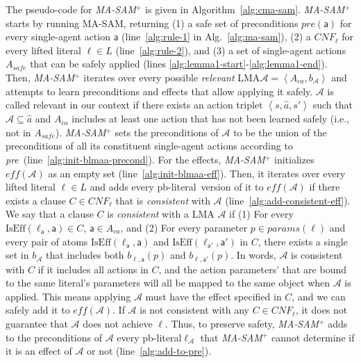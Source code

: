 \documentclass[letterpaper]{article} %
\newcommand{\pre}{\textit{pre}}
\newcommand{\eff}{\textit{eff}}
\theoremstyle{definition}
\theoremstyle{remark}
\newcommand{\tuple}[1]{\ensuremath{\left \langle #1 \right \rangle }}
\newcommand{\params}{\textit{params}}
\newcommand{\cnf}{\textit{CNF}}
\newcommand{\liftl}{\ensuremath{\ell}}
\newcommand{\lifta}{\mathsf{a}}
\newcommand{\iseff}{\text{IsEff}}
\newcommand{\masam}{\ac{MA-SAM}\xspace}
\newcommand{\cmasam}{\textit{MA-SAM\ensuremath{^+}}\xspace}
\newcommand{\blmaa}{\ac{LMA}\xspace}
\newcommand{\pbl}{pb-literal\xspace}
\begin{document}
The pseudo-code for \cmasam is given in Algorithm~\ref{alg:cma-sam}. 
\cmasam starts by running \masam, returning (1) a safe set of preconditions $\pre(\lifta)$ for every single-agent action $\lifta$ (line~\ref{alg:rule-1} in Alg.~\ref{alg:ma-sam}), 
(2) a $CNF_{\liftl}$ for every lifted literal $\liftl \in L$  (line~\ref{alg:rule-2}), 
and (3) a set of single-agent actions $A_{safe}$ that can be safely applied (lines \ref{alg:lemma1-start}-\ref{alg:lemma1-end}).  
Then, \cmasam iterates over every possible \emph{relevant} \blmaa $\mathcal{A}=\tuple{A_{ca},b_\mathcal{A}}$ and attempts to learn preconditions and effects that allow applying it safely. 
$\mathcal{A}$ is called relevant in our context if there exists an action triplet $\tuple{s,\hat{a},s'}$ such that 
$\mathcal{A} \subseteq \hat{a}$ and $A_{ca}$ includes at least one action that has not been learned safely (i.e., not in $A_{safe}$).
\cmasam sets the preconditions of $\mathcal{A}$ to be the union of the preconditions of all its constituent single-agent actions according to \pre\ (line~\ref{alg:init-blmaa-precond}). 
For the effects, \cmasam initializes $\eff(\mathcal{A})$ as an empty set (line~\ref{alg:init-blmaa-eff}). 
Then, it iterates over every lifted literal $\liftl\in L$ and adds every \pbl\ version of it to $\eff(\mathcal{A})$ if there exists a clause $C\in \cnf_{\liftl}$ that is \textit{consistent} with $\mathcal{A}$ (line~\ref{alg:add-consistent-eff}). 
We say that a clause $C$ is \emph{consistent} with a \blmaa 
$\mathcal{A}$ if (1) For every $\iseff(\liftl_\lifta, \lifta)\in C$, $\lifta\in A_{ca}$, 
and (2) For every parameter $p\in\params(\liftl)$ and every pair of atoms
$\iseff(\liftl_\lifta, \lifta)$ and
$\iseff(\liftl_{\lifta '}, \lifta ')$ in $C$,
there exists a single set in $b_\mathcal{A}$ that includes 
both $b_{\liftl,\lifta}(p)$ and $b_{\liftl,\lifta'}(p)$. 
In words, $\mathcal{A}$ is consistent with $C$ if it includes all actions in $C$, and the action parameters' that are bound to the same literal's parameters will all be mapped to the same object when $\mathcal{A}$ is applied. This means applying $\mathcal{A}$ must have the effect specified in $C$, and we can safely add it to $\eff(\mathcal{A})$.  
If $\mathcal{A}$ is not consistent with any $C\in \cnf_{\liftl}$, it does not guarantee that $\mathcal{A}$ does not achieve $\liftl$. Thus, to preserve safety, \cmasam adds to the preconditions of $\mathcal{A}$ every \pbl  $\ell_\mathcal{A}$ that \cmasam cannot determine if it is an effect of $\mathcal{A}$ or not (line~\ref{alg:add-to-pre}). 
\end{document}
